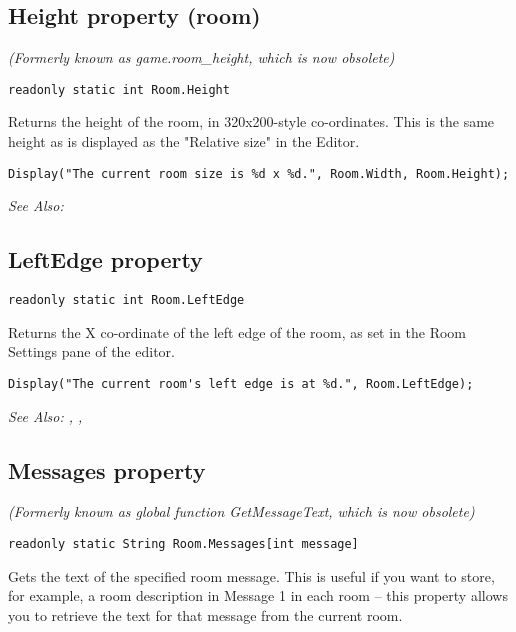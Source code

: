 \subsection{Height property (room)}\label{Room.Height}%

\it{(Formerly known as game.room_height, which is now obsolete)}

\begin{verbatim}
readonly static int Room.Height
\end{verbatim}
Returns the height of the room, in 320x200-style co-ordinates. This is
the same height as is displayed as the "Relative size" in the Editor.

\begin{verbatim}
Display("The current room size is %d x %d.", Room.Width, Room.Height);
\end{verbatim}

\it{See Also:} 


\subsection{LeftEdge property}\label{Room.LeftEdge}%

\begin{verbatim}
readonly static int Room.LeftEdge
\end{verbatim}
Returns the X co-ordinate of the left edge of the room, as set in the Room Settings
pane of the editor.

\begin{verbatim}
Display("The current room's left edge is at %d.", Room.LeftEdge);
\end{verbatim}

\it{See Also:} , ,


\subsection{Messages property}\label{Room.Messages}%

\it{(Formerly known as global function GetMessageText, which is now obsolete)}

\begin{verbatim}
readonly static String Room.Messages[int message]
\end{verbatim}
Gets the text of the specified room message. This is useful if you want to store,
for example, a room description in Message 1 in each room -- this property allows
you to retrieve the text for that message from the current room.

